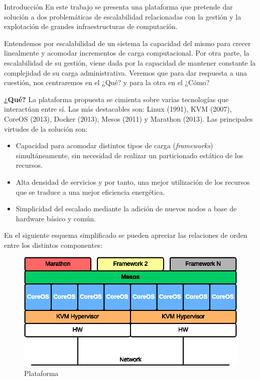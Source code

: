 \documentclass[a4paper,12pt,spanish,final]{epsc_tfc_pfc}
\begin{document}
\begin{intro}{Introducción}
En este trabajo se presenta una plataforma que pretende dar solución a dos problemáticas de escalabilidad relacionadas con la gestión y la explotación de grandes infraestructuras de computación.

Entendemos por escalabilidad de un sistema la capacidad del mismo para crecer linealmente y acomodar incrementos de carga computacional. Por otra parte, la escalabilidad de su gestión, viene dada por la capacidad de mantener constante la complejidad de su carga administrativa. Veremos que para dar respuesta a una cuestión, nos centraremos en el ¿Qué? y para la otra en el ¿Cómo?

\textbf{¿Qué?} La plataforma propuesta se cimienta sobre varias tecnologías que interactúan entre sí. Las más destacables son: Linux (1991), KVM (2007), CoreOS (2013), Docker (2013), Mesos (2011) y Marathon (2013). Las principales virtudes de la solución son:
\begin{itemize}
  \item Capacidad para acomodar distintos tipos de carga (\emph{frameworks}) simultáneamente, sin necesidad de realizar un particionado estático de los recursos.
  \item Alta densidad de servicios y por tanto, una mejor utilización de los recursos que se traduce a una mejor eficiencia energética.
  \item Simplicidad del escalado mediante la adición de nuevos nodos a base de hardware básico y común.
\end{itemize}

En el siguiente esquema simplificado se pueden apreciar las relaciones de orden entre los distintos componentes:\\

\begin{figure}[h]
  \centering
    \includegraphics[scale=1]{plataforma}
      \caption{Plataforma}
\end{figure}


\end{intro}
\end{document}
